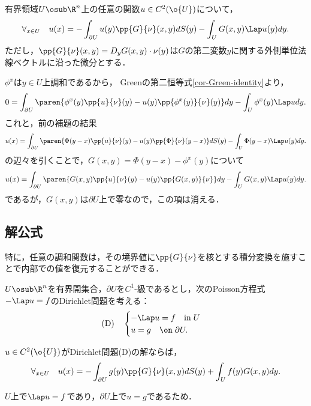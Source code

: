 \documentclass[uplatex,dvipdfmx]{jsreport}
\begin{document}
\begin{lemma}[Green関数による関数の積分表示]\label{lemma-decomposition-of-C2-function-through-Green-function}
    有界領域$U\osub\R^n$上の任意の関数$u\in C^2(\o{U})$について，
    \[\forall_{x\in U}\quad u(x)=-\int_{\partial U}u(y)\pp{G}{\nu}(x,y)dS(y)-\int_UG(x,y)\Lap u(y)dy.\]
    ただし，$\pp{G}{\nu}(x,y)=D_yG(x,y)\cdot\nu(y)$は$G$の第二変数$y$に関する外側単位法線ベクトルに沿った微分とする．
\end{lemma}
\begin{Proof}
    $\phi^x$は$y\in U$上調和であるから，
    Greenの第二恒等式\ref{cor-Green-identity}より，
    \[0=\int_{\partial U}\paren{\phi^x(y)\pp{u}{\nu}(y)-u(y)\pp{\phi^x(y)}{\nu}(y)}dy-\int_U\phi^x(y)\Lap udy.\]
    これと，前の補題の結果
    \[u(x)=\int_{\partial U}\paren{\Phi(y-x)\pp{u}{\nu}(y)-u(y)\pp{\Phi}{\nu}(y-x)}dS(y)-\int_U\Phi(y-x)\Lap u(y)dy.\]
    の辺々を引くことで，$G(x,y)=\Phi(y-x)-\phi^x(y)$について
    \[u(x)=\int_{\partial U}\paren{G(x,y)\pp{u}{\nu}(y)-u(y)\pp{G(x,y)}{\nu}}dy-\int_UG(x,y)\Lap u(y)dy.\]
    であるが，$G(x,y)$は$\partial U$上で零なので，この項は消える．
\end{Proof}

\subsection{解公式}

\begin{tcolorbox}[colframe=ForestGreen, colback=ForestGreen!10!white,breakable,colbacktitle=ForestGreen!40!white,coltitle=black,fonttitle=\bfseries\sffamily,
    title=]
    特に，任意の調和関数は，その境界値に$\pp{G}{\nu}$を核とする積分変換を施すことで内部での値を復元することができる．
\end{tcolorbox}

\begin{problem}[境界を持つ有界領域上のPoisson方程式のDirichlet問題の解法]
    $U\osub\R^n$を有界開集合，$\partial U$を$C^1$-級であるとし，次のPoisson方程式$-\Lap u=f$のDirichlet問題を考える：
    \[\text{(D)}\quad\begin{cases}
        -\Lap u=f\quad\mathrm{in}\;U\\
        u=g\quad\on\;\partial U.
    \end{cases}\]
\end{problem}

\begin{corollary}[Green関数によるDirichlet問題の解の積分表示]\label{cor-solution-via-Green-function}
    $u\in C^2(\o{U})$がDirichlet問題(D)の解ならば，
    \[\forall_{x\in U}\quad u(x)=-\int_{\partial U}g(y)\pp{G}{\nu}(x,y)dS(y)+\int_Uf(y)G(x,y)dy.\]
\end{corollary}
\begin{Proof}
    $U$上で$\Lap u=f$であり，$\partial U$上で$u=g$であるため．
\end{Proof}
\end{document}
